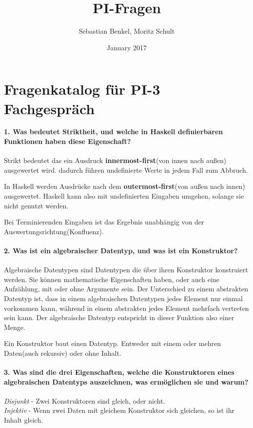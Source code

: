 \documentclass{article}
\title{PI-Fragen}
\author{Sebastian Benkel, Moritz Schult}
\date{January 2017}
\begin{document}
\maketitle

\section{Fragenkatalog für PI-3 Fachgespräch}


\textbf{1. Was bedeutet Striktheit, und welche in Haskell definierbaren Funktionen haben diese Eigenschaft?}
\\
\\
Strikt bedeutet das ein Ausdruck \textbf{innermost-first}(von innen nach au\ss en) ausgewertet wird. dadurch f\"uhren undefinierte Werte in jedem Fall zum Abbruch.


In Haskell werden Ausdr\"ucke nach dem \textbf{outermost-first}(von au\ss en nach innen) ausgewertet. Haskell kann also mit undefinierten Eingaben umgehen, solange sie nicht genutzt werden.

Bei Terminierenden Eingaben ist das Ergebnis unabh\"angig von der Auswertungsrichtung(Konfluenz).
\\
\\
\textbf{2. Was ist ein algebraischer Datentyp, und was ist ein Konstruktor?}
\\
\\
Algebraische Datentypen sind Datentypen die \"uber ihren Konstruktor konstruiert werden. Sie können mathematische Eigenschaften haben, oder auch eine Aufz\"ahlung, mit oder ohne Argumente sein.
Der Unterschied zu einem abstrakten Datentyp ist, dass in einem algebraischen Datentypen jedes Element nur einmal vorkommen kann, während in einem abstrakten jedes Element mehrfach vertreten sein kann. Der algebraische Datentyp entspricht in dieser Funktion also einer Menge.

Ein Konstruktor baut einen Datentyp. Entweder mit einem oder mehren Daten(auch rekursiv) oder ohne Inhalt.
\\
\\
\textbf{3. Was sind die drei Eigenschaften, welche die Konstruktoren eines algebraischen Datentyps auszeichnen, was ermöglichen sie und warum?}
\\
\\
\emph{Disjunkt} - Zwei Konstruktoren sind gleich, oder nicht.
\\
\emph{Injektiv} - Wenn zwei Daten mit gleichem Konstruktor sich gleichen, so ist ihr Inhalt gleich.
\end{document}
